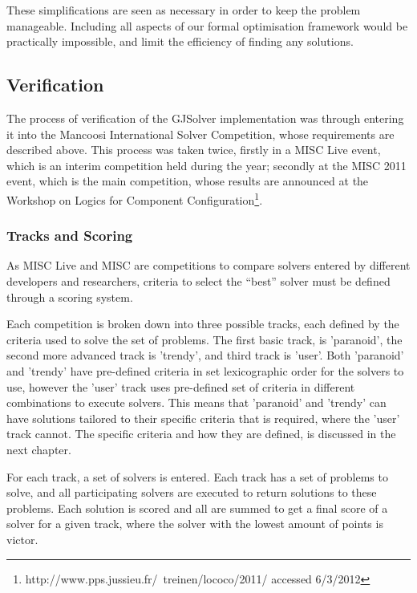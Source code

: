 These simplifications are seen as necessary in order to keep the problem manageable.
Including all aspects of our formal optimisation framework would be practically impossible, and limit the efficiency of finding any solutions.

\subsection{Verification}
\label{impl.verif}
The process of verification of the GJSolver implementation was through entering it into the Mancoosi International Solver Competition, whose requirements are described above.
This process was taken twice, firstly in a MISC Live event, which is an interim competition held during the year;
secondly at the MISC 2011 event, 
which is the main competition, whose results are announced at the Workshop on Logics for Component Configuration\footnote{http://www.pps.jussieu.fr/~treinen/lococo/2011/ accessed 6/3/2012}.

\subsubsection{Tracks and Scoring}
As MISC Live and MISC are competitions to compare solvers entered by different developers and researchers,
criteria to select the ``best'' solver must be defined through a scoring system.

Each competition is broken down into three possible tracks, each defined by the criteria used to solve the set of problems.
The first basic track, is 'paranoid', the second more advanced track is 'trendy', and third track is 'user'.
Both 'paranoid' and 'trendy' have pre-defined criteria in set lexicographic order for the solvers to use, 
however the 'user' track uses pre-defined set of criteria in different combinations to execute solvers.
This means that 'paranoid' and 'trendy' can have solutions tailored to their specific criteria that is required, where the 'user' track cannot.
The specific criteria and how they are defined, is discussed in the next chapter.

For each track, a set of solvers is entered.
Each track has a set of problems to solve, and all participating solvers are executed to return solutions to these problems.
Each solution is scored and all are summed to get a final score of a solver for a given track, where the solver with the lowest amount of points is victor.

